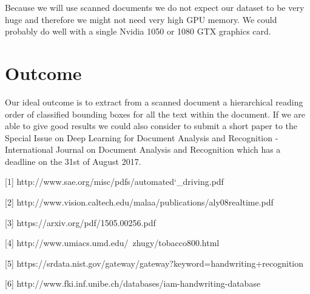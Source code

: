 \documentclass[10pt,twocolumn,letterpaper]{article}
\begin{document}
	Because we will use scanned documents we do not expect our dataset to be very huge and therefore we might not need very high GPU memory. We could probably do well with a single Nvidia 1050 or 1080 GTX graphics card. 
	
	\section{Outcome}
	Our ideal outcome is to extract from a scanned document a hierarchical reading order of classified bounding boxes for all the text within the document. If we are able to give good results we could also consider to submit a short paper to the Special Issue on Deep Learning for Document Analysis and Recognition - International Journal on Document Analysis and Recognition which has a deadline on the 31st of August 2017.
	{\small
		
		
		
		[1] http://www.sae.org/misc/pdfs/automated\char`_driving.pdf
		
		[2] http://www.vision.caltech.edu/malaa/publications/aly08realtime.pdf
		
		[3] https://arxiv.org/pdf/1505.00256.pdf
		
		[4] http://www.umiacs.umd.edu/~zhugy/tobacco800.html
		
		[5] https://srdata.nist.gov/gateway/gateway?keyword=handwriting+recognition
		
		
		[6] http://www.fki.inf.unibe.ch/databases/iam-handwriting-database
		
						
				
	}
	
\end{document}

